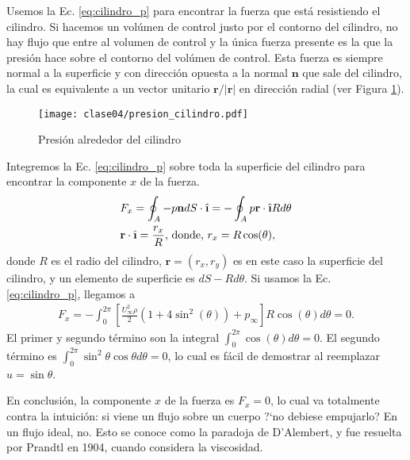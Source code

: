 Usemos la Ec. \eqref{eq:cilindro_p} para encontrar la fuerza que está resistiendo el cilindro.
Si hacemos un volúmen de control justo por el contorno del cilindro, no hay flujo que entre al volumen de control y la única fuerza presente es la que la presión hace sobre el contorno del volúmen de control.
Esta fuerza es siempre normal a la superficie y con dirección opuesta a la normal $\mathbf{n}$ que sale del cilindro, la cual es equivalente a un vector unitario $\mathbf{r}/|\mathbf{r}|$ en dirección radial (ver Figura \ref{fig:presion_cilindro}).
%
\begin{figure}[h!]
\centering
\texttt{[image: clase04/presion\_cilindro.pdf]}
\caption{Presión alrededor del cilindro}
\label{fig:presion_cilindro}
\end{figure}

Integremos la Ec. \eqref{eq:cilindro_p} sobre toda la superficie del cilindro para encontrar la componente $x$ de la fuerza.
%
\begin{align}\label{eq:fuerza_x}
&F_x = \oint_A -p\mathbf{n}dS\cdot\ihat = -\oint_A p\mathbf{r}\cdot\ihat Rd\theta \nonumber\\
&\mathbf{r}\cdot\ihat =\frac{r_x}{R} \text{, donde, } r_x = R\cos(\theta),
\end{align}
%
donde $R$ es el radio del cilindro, $\mathbf{r}=(r_x,r_y)$ es en este caso la superficie del cilindro, y un elemento de superficie es $dS-Rd\theta$.
Si usamos la Ec. \eqref{eq:cilindro_p}, llegamos a
%
\begin{align}
F_x = -\int_0^{2\pi}\left[\frac{U_\infty^2\rho}{2}(1+4\sin^2(\theta))+p_\infty\right]R\cos(\theta)d\theta=0.
\end{align}
El primer y segundo término son la integral $\int_0^{2\pi}\cos(\theta)d\theta=0$.
El segundo término es $\int_0^{2\pi}\sin^2\theta\cos\theta d\theta=0$, lo cual es fácil de demostrar al reemplazar $u=\sin\theta$.

En conclusión, la componente $x$ de la fuerza es $F_x=0$, lo cual va totalmente contra la intuición: si viene un flujo sobre un cuerpo \mbox{?`}no debiese empujarlo? En un flujo ideal, no.
Esto se conoce como la paradoja de D'Alembert, y fue resuelta por Prandtl en 1904, cuando considera la viscosidad. 

